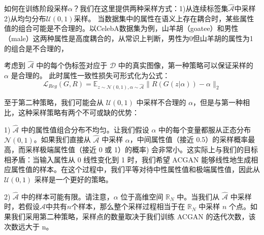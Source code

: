 如何在训练阶段采样$\alpha$？我们在这里提供两种采样方式：1)从连续标签集$\hat{\mathcal{A}}$中采样 2)从均匀分布$\mathcal{U}(0,1)$采样。
当数据集中的属性在语义上存在耦合时，某些属性值的组合可能是不合理的。以CelebA数据集为例，山羊胡（goatee）和男性（male）这两种属性是高度耦合的，从常识上判断，男性为0但山羊胡的属性为1的组合是不合理的，

考虑到 $\hat{\mathcal{A}}$ 中的每个伪标签对应于 $\mathcal{D}$ 中的真实图像，第一种策略可以保证采样的 $\alpha$ 是合理的。
此时属性一致性损失可形式化为公式：
\begin{equation}
   \mathcal{L}_{Reg}(G, R)  =  \mathbb{E}_{z \sim \mathcal{N}(0,1), \alpha \sim \hat{\mathcal{A}}}\|R(G(z|\alpha)) - \alpha\|_2
\end{equation}

至于第二种策略，我们可能会从 $\mathcal{U}(0,1)$ 中采样不合理的 $\alpha$，但是与第一种相比，这种采样策略有两个不可或缺的优势：

1) $\hat{\mathcal{A}}$ 中的属性值组合分布不均匀。让我们假设 $\alpha$ 中的每个变量都服从正态分布 $\mathcal{N}(0,1)$。如果我们直接从 $\hat{\mathcal{A}}$ 中采样 $\alpha$，中间属性值（接近 0.5）的采样概率最高，而采样极端属性值（接近 0 或 1）的概率) 会非常小。这实际上与我们的目标相矛盾：当输入属性从 0 线性变化到 1 时，我们希望 ACGAN 能够线性地生成相应属性值的样本。在这个过程中，我们平等对待中性属性值和极端属性值，因此从 $\mathcal{U}(0,1)$ 采样是一个更好的策略。

2) $\hat{\mathcal{A}}$ 中的样本可能有限。请注意，$\alpha$ 位于高维空间 $\mathbb{R}_N$ 中。当我们从 $\hat{\mathcal{A}}$ 中采样时，若假设${\mathcal{A}}$中共有$n$个样本，那么整个采样过程相当于在 $\mathbb{R}_N$ 中采样 $n$ 个点。如果我们采用第二种策略，采样点的数量取决于我们训练 ACGAN 的迭代次数，该次数远大于 n。

